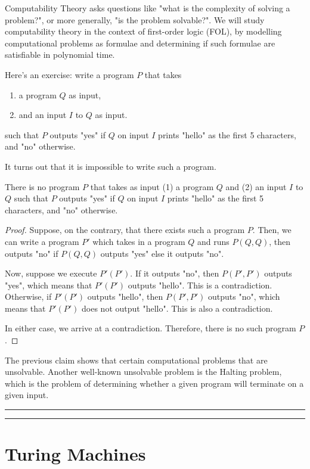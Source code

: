 \documentclass[11pt,usenames, dvipsnames]{article}
\begin{document}
Computability Theory asks questions like "what is the complexity of solving a problem?", or more generally, "is the problem solvable?". We will study computability theory in the context of first-order logic (FOL), by modelling computational problems as formulae and determining if such formulae are satisfiable in polynomial time.

Here's an exercise: write a program $P$ that takes
\begin{enumerate}
  \item a program $Q$ as input,
  \item and an input $I$ to $Q$ as input.
\end{enumerate}
such that $P$ outputs "yes" if $Q$ on input $I$ prints "hello" as the first 5 characters, and "no" otherwise.

It turns out that it is impossible to write such a program.

\begin{claim}
  There is no program $P$ that takes as input (1) a program $Q$ and (2) an input $I$ to $Q$ such that $P$ outputs "yes" if $Q$ on input $I$ prints "hello" as the first 5 characters, and "no" otherwise.
\end{claim}

\begin{proof}
  Suppose, on the contrary, that there exists such a program $P$. Then, we can write a program $P'$ which takes in a program $Q$ and runs $P(Q, Q)$, then outputs "no" if $P(Q, Q)$ outputs "yes" else it outputs "no".

  Now, suppose we execute $P'(P')$. If it outputs "no", then $P(P', P')$ outputs "yes", which means that $P'(P')$ outputs "hello". This is a contradiction. Otherwise, if $P'(P')$ outputs "hello", then $P(P', P')$ outputs "no", which means that $P'(P')$ does not output "hello". This is also a contradiction.

  In either case, we arrive at a contradiction. Therefore, there is no such program $P$.
\end{proof}

The previous claim shows that certain computational problems that are unsolvable. Another well-known unsolvable problem is the Halting problem, which is the problem of determining whether a given program will terminate on a given input.

\vspace{5truemm}
\hrule
\hrule

\section*{\large \centering Turing Machines}
\noindent
\end{document}
